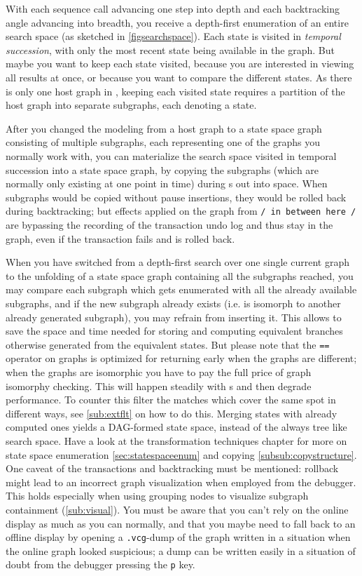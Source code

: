 With each sequence call advancing one step into depth and each backtracking angle advancing into breadth, you receive a depth-first enumeration of an entire search space (as sketched in \ref{figsearchspace}).
Each state is visited in \emph{temporal succession}, with only the most recent state being available in the graph.
But maybe you want to keep each state visited, because you are interested in viewing all results at once, or because you want to compare the different states.
As there is only one host graph in \GrG, keeping each visited state requires a partition of the host graph into separate subgraphs, each denoting a state.

After you changed the modeling from a host graph to a state space graph consisting of multiple subgraphs, each representing one of the graphs you normally work with, 
you can materialize the search space visited in temporal succession into a state space graph,
by copying the subgraphs (which are normally only existing at one point in time) during s out into space.
When subgraphs would be copied without pause insertions, they would be rolled back during backtracking; but effects applied on the graph from \texttt{/ in between here /} are bypassing the recording of the transaction undo log and thus stay in the graph, even if the transaction fails and is rolled back. 

When you have switched from a depth-first search over one single current graph to the unfolding of a state space graph containing all the subgraphs reached, you may compare each subgraph which gets enumerated with all the already available subgraphs, and if the new subgraph already exists (i.e. is isomorph to another already generated subgraph), you may refrain from inserting it.
This  allows to save the space and time needed for storing and computing equivalent branches otherwise generated from the equivalent states. 
But please note that the \texttt{==} operator on graphs is optimized for returning early when the graphs are different; when the graphs are isomorphic you have to pay the full price of graph isomorphy checking.
This will happen steadily with s and then degrade performance.
To counter this filter the matches which cover the same spot in different ways, see \ref{sub:extflt} on how to do this.
Merging states with already computed ones yields a DAG-formed state space, instead of the always tree like search space.
Have a look at the transformation techniques chapter for more on state space enumeration \ref{sec:statespaceenum} and copying \ref{subsub:copystructure}.
One caveat of the transactions and backtracking must be mentioned: rollback might lead to an incorrect graph visualization when employed from the debugger.
This holds especially when using grouping nodes to visualize subgraph containment (\ref{sub:visual}). You must be aware that you can't rely on the online display as much as you can normally, and that you maybe need to fall back to an offline display by opening a \texttt{.vcg}-dump of the graph written in a situation when the online graph looked suspicious; a dump can be written easily in a situation of doubt from the debugger pressing the \texttt{p} key. 

